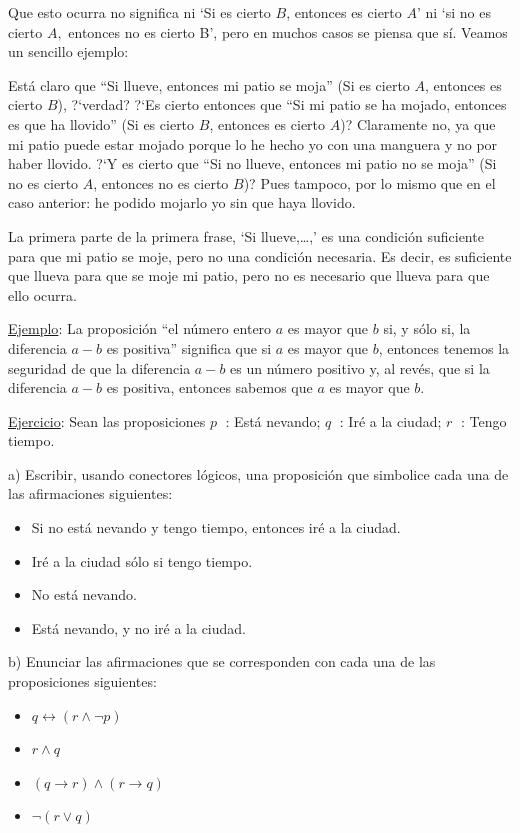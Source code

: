 Que esto ocurra no significa ni `Si es cierto $B$, entonces es cierto $A$' ni `si no es cierto $A$$,$ entonces no es cierto B', pero en muchos casos se piensa que sí. Veamos un sencillo ejemplo: 

Está claro que ``Si llueve, entonces mi patio se moja'' (Si es cierto $A$, entonces es cierto $B$), ?`verdad? ?`Es cierto entonces que ``Si mi patio se ha mojado, entonces es que ha llovido'' (Si es cierto $B$, entonces es cierto $A$)? Claramente no, ya que mi patio puede estar mojado porque lo he hecho yo con una manguera y no por haber llovido. ?`Y es cierto que ``Si no llueve, entonces mi patio no se moja'' (Si no es cierto $A$, entonces no es cierto $B$)? Pues tampoco, por lo mismo que en el caso anterior: he podido mojarlo yo sin que haya llovido.

La primera parte de la primera frase, `Si llueve,…,'  es una condición suficiente para que mi patio se moje, pero no una condición necesaria. Es decir, es suficiente que llueva para que se moje mi patio, pero no es necesario que llueva para que ello ocurra.

\underline{Ejemplo}: La proposición ``el número entero $a$ es mayor que $b$ si, y sólo si, la diferencia $a - b$ es positiva'' significa que si $a$ es mayor que $b$, entonces tenemos la seguridad de que la diferencia $ a- b $ es un número positivo y, al revés, que si la diferencia $a - b$ es positiva, entonces sabemos que $a$ es mayor que $b$.

\underline{Ejercicio}: Sean las proposiciones $p\; $ : Está nevando;   $q\; $ : Iré a la ciudad;  $r\; $ : Tengo tiempo.  
\begin{multicols}{2}
	
a) Escribir, usando conectores lógicos, una proposición que simbolice cada una de las afirmaciones siguientes: 
\begin{itemize}
\item Si no está nevando y tengo tiempo, entonces iré a la ciudad. 
\item Iré a la ciudad sólo si tengo tiempo.
\item No está nevando.
\item Está nevando, y no iré a la ciudad.
\end{itemize} 

b) Enunciar las afirmaciones que se corresponden con cada una de las proposiciones siguientes: 
\begin{itemize}
\item $q \leftrightarrow (r \wedge  \neg p)$
\item $r \wedge q$
\item $(q \to  r) \wedge (r \to q)$ 
\item $\neg (r \vee q)$
\end{itemize} 

\end{multicols}


